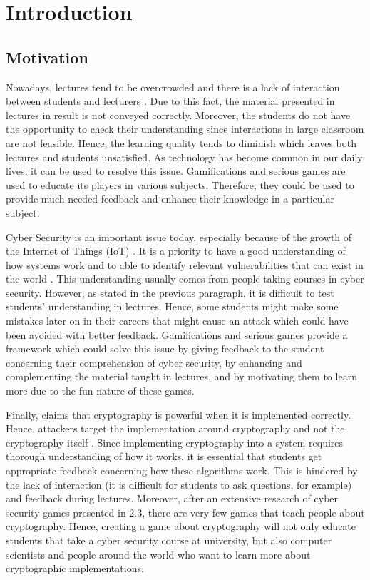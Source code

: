 \documentclass{l4proj}
\begin{document}
\chapter{Introduction} \label{sec:Introduction}



\section{Motivation}

Nowadays, lectures tend to be overcrowded and there is a lack of interaction between students and lecturers \citep{lehmann_theory-driven_2014}.
Due to this fact, the material presented in lectures in result is not conveyed correctly.
Moreover, the students do not have the opportunity to check their understanding since interactions in large classroom are not feasible.
Hence, the learning quality tends to diminish which leaves both lectures and students unsatisfied.
As technology has become common in our daily lives, it can be used to resolve this issue.
Gamifications and serious games are used to educate its players in various subjects.
Therefore, they could be used to provide much needed feedback and enhance their knowledge in a particular subject.

Cyber Security is an important issue today, especially because of the growth of the Internet of Things (IoT) \citep{abomhara_cyber_2015}.
It is a priority to have a good understanding of how systems work and to able to identify relevant vulnerabilities that can exist in the world \citep{abomhara_cyber_2015}.
This understanding usually comes from people taking courses in cyber security.
However, as stated in the previous paragraph, it is difficult to test students' understanding in lectures.
Hence, some students might make some mistakes later on in their careers that might cause an attack 
which could have been avoided with better feedback.
Gamifications and serious games provide a framework which could solve this issue 
by giving feedback to the student concerning their comprehension of cyber security, by enhancing and complementing the material taught in lectures,
and by motivating them to learn more due to the fun nature of these games.

Finally, \citet{schneier_security_nodate} claims that cryptography is powerful when it is implemented correctly.
Hence, attackers target the implementation around cryptography and not the cryptography itself \citep{schneier_security_nodate} \citep{lazar_why_nodate}.
Since implementing cryptography into a system requires thorough understanding of how it works,
it is essential that students get appropriate feedback concerning how these algorithms work.
This is hindered by the lack of interaction (it is difficult for students to ask questions, for example) and feedback during lectures.
Moreover, after an extensive research of cyber security games presented in 2.3, there are very few games that teach people about cryptography.
Hence, creating a game about cryptography will not only educate students that take a cyber security course at university, 
but also computer scientists and people around the world who want to learn more about cryptographic implementations.
\end{document}
